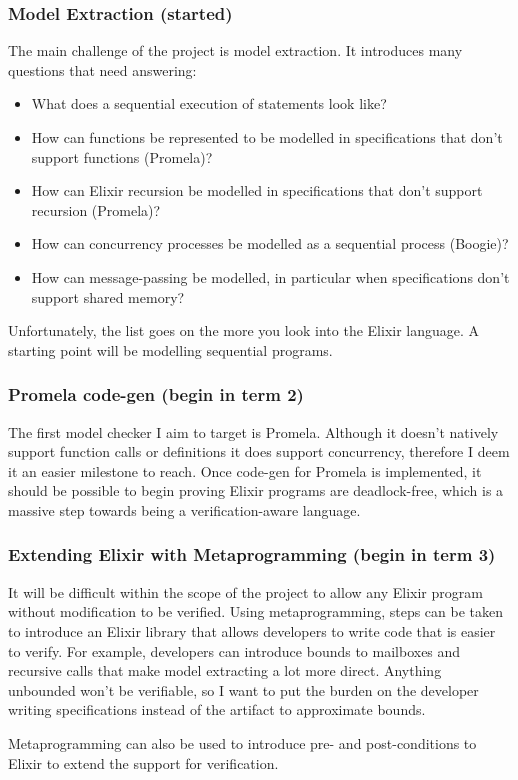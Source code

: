 \subsubsection{Model Extraction (started)}
The main challenge of the project is model extraction. It introduces many questions that need answering:
\begin{itemize}
    \item What does a sequential execution of statements look like?
    \item How can functions be represented to be modelled in specifications that don't support functions (Promela)?
    \item How can Elixir recursion be modelled in specifications that don't support recursion (Promela)?
    \item How can concurrency processes be modelled as a sequential process (Boogie)?
    \item How can message-passing be modelled, in particular when specifications don't support shared memory?
\end{itemize}
Unfortunately, the list goes on the more you look into the Elixir language. A starting point will be modelling sequential programs.
\subsubsection{Promela code-gen (begin in term 2)}
The first model checker I aim to target is Promela. Although it doesn't natively support function calls or definitions it does support concurrency, therefore I deem it an easier milestone to reach. Once code-gen for Promela is implemented, it should be possible to begin proving Elixir programs are deadlock-free, which is a massive step towards being a verification-aware language.
\subsubsection{Extending Elixir with Metaprogramming (begin in term 3)}
It will be difficult within the scope of the project to allow any Elixir program without modification to be verified. Using metaprogramming, steps can be taken to introduce an Elixir library that allows developers to write code that is easier to verify. For example, developers can introduce bounds to mailboxes and recursive calls that make model extracting a lot more direct. Anything unbounded won't be verifiable, so I want to put the burden on the developer writing specifications instead of the artifact to approximate bounds.
\par
Metaprogramming can also be used to introduce pre- and post-conditions to Elixir to extend the support for verification.
